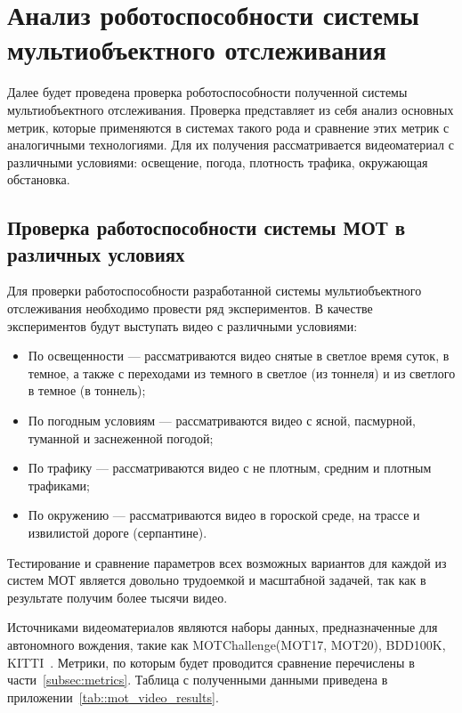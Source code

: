 \section{Анализ роботоспособности системы мультиобъектного отслеживания}

Далее будет проведена проверка роботоспособности полученной системы мультиобъектного отслеживания. Проверка представляет из себя анализ основных метрик, которые применяются в системах такого рода и сравнение этих метрик с аналогичными технологиями. Для их получения рассматривается видеоматериал с различными условиями: освещение, погода, плотность трафика, окружающая обстановка. 

\subsection{Проверка работоспособности системы МОТ в различных условиях}

Для проверки работоспособности разработанной системы мультиобъектного отслеживания необходимо провести ряд экспериментов. В качестве экспериментов будут выступать видео с различными условиями:

\begin{itemize}
    \item По освещенности --- рассматриваются видео снятые в светлое время суток, в темное, а также с переходами из темного в светлое (из тоннеля) и из светлого в темное (в тоннель);
    \item По погодным условиям --- рассматриваются видео с ясной, пасмурной, туманной и заснеженной погодой;
    \item По трафику --- рассматриваются видео с не плотным, средним и плотным трафиками;
    \item По окружению --- рассматриваются видео в гороской среде, на трассе и извилистой дороге (серпантине).
\end{itemize}

Тестирование и сравнение параметров всех возможных вариантов для каждой из систем МОТ является довольно трудоемкой и масштабной задачей, так как в результате получим более тысячи видео.

Источниками видеоматериалов являются наборы данных, предназначенные для автономного вождения, такие как MOTChallenge(MOT17, MOT20), BDD100K, KITTI~\cite{cao2022observation}. Метрики, по которым будет проводится сравнение перечислены в части~\ref{subsec:metrics}. 
Таблица с полученными данными приведена в приложении~\ref{tab::mot_video_results}.

